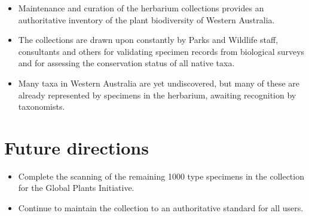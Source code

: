 \documentclass[version=last,
    paper=a4, %
    10pt, %
    usenames,
    dvipsnames,
    oneside, %
    headings=openany, %
    DIV=15 %
]{scrbook}
\begin{document}
\begin{itemize}
\itemsep1pt\parskip0pt
\item
  Maintenance and curation of the herbarium collections provides an
  authoritative inventory of the plant biodiversity of Western
  Australia.
\item
  The collections are drawn upon constantly by Parks and Wildlife staff,
  consultants and others for validating specimen records from biological
  surveys and for assessing the conservation status of all native taxa.
\item
  Many taxa in Western Australia are yet undiscovered, but many of these
  are already represented by specimens in the herbarium, awaiting
  recognition by taxonomists.
\end{itemize}




\section*{Future directions}

\begin{itemize}
\itemsep1pt\parskip0pt
\item
  Complete the scanning of the remaining 1000 type specimens in the
  collection for the Global Plants Initiative.
\item
  Continue to maintain the collection to an authoritative standard for
  all users.
\end{itemize}



\end{document}
